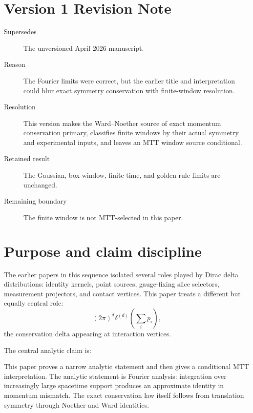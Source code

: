 \documentclass[11pt]{article}
\begin{document}
\section*{Version 1 Revision Note}
\begin{description}
\item[Supersedes] The unversioned April 2026 manuscript.
\item[Reason] The Fourier limits were correct, but the earlier title and interpretation
could blur exact symmetry conservation with finite-window resolution.
\item[Resolution] This version makes the Ward--Noether source of exact momentum
conservation primary, classifies finite windows by their actual symmetry and experimental
inputs, and leaves an MTT window source conditional.
\item[Retained result] The Gaussian, box-window, finite-time, and golden-rule limits are
unchanged.
\item[Remaining boundary] The finite window is not MTT-selected in this paper.
\end{description}

\seriestagline

\tableofcontents

\section{Purpose and claim discipline}

The earlier papers in this sequence isolated several roles played by Dirac delta distributions:
identity kernels, point sources, gauge-fixing slice selectors, measurement projectors, and contact vertices.  This paper treats a different but equally central role:
\[
(2\pi)^d\delta^{(d)}\!\left(\sum_i p_i\right),
\]
the conservation delta appearing at interaction vertices.

The central analytic claim is:
\begin{center}
\end{center}

This paper proves a narrow analytic statement and then gives a conditional MTT
interpretation.  The analytic statement is Fourier analysis: integration over increasingly
large spacetime support produces an approximate identity in momentum mismatch.  The exact
conservation law itself follows from translation symmetry through Noether and Ward identities.
\end{document}
